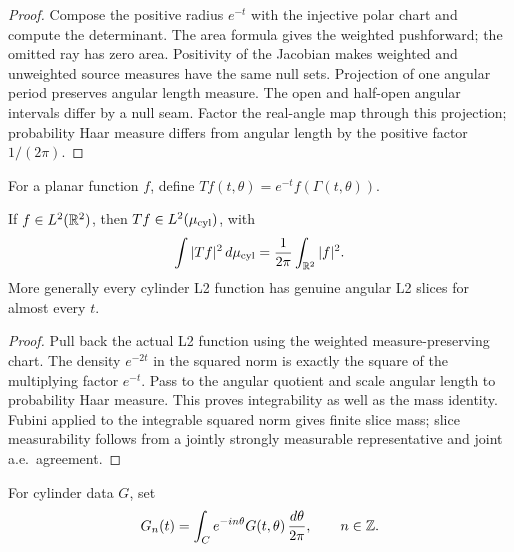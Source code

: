 \begin{proof}
\leanok
Compose the positive radius $e^{-t}$ with the injective polar chart and
compute the determinant. The area formula gives the weighted pushforward;
the omitted ray has zero area. Positivity of the Jacobian makes weighted
and unweighted source measures have the same null sets.
Projection of one angular period preserves angular length measure.
The open and half-open angular intervals differ by a null seam.
Factor the real-angle map through this projection; probability Haar measure
differs from angular length by the positive factor $1/(2\pi)$.
\end{proof}

\begin{definition}
\label{def:log-cylinder-l2-pullback}
\leanok
For a planar function $f$, define $Tf(t,\theta)=e^{-t}f(\Gamma(t,\theta))$.
\end{definition}

\begin{lemma}
\label{lem:log-cylinder-l2-mass}
\leanok
If $f\in L^2(\mathbb{R}^2)$, then $Tf\in L^2(\mu_{\rm cyl})$, with
\[
 \int |Tf|^2\,d\mu_{\rm cyl}=\frac1{2\pi}\int_{\mathbb{R}^2}|f|^2.
\]
More generally every cylinder L2 function has genuine angular L2 slices
for almost every $t$.
\end{lemma}

\begin{proof}
\leanok
Pull back the actual L2 function using the weighted measure-preserving chart.
The density $e^{-2t}$ in the squared norm is exactly the square of the
multiplying factor $e^{-t}$. Pass to the angular quotient and scale angular
length to probability Haar measure. This proves integrability as well as the
mass identity. Fubini applied to the integrable squared norm gives finite
slice mass; slice measurability follows from a jointly strongly measurable
representative and joint a.e.\ agreement.
\end{proof}

\begin{definition}
\label{def:cylinder-angular-analysis}
\leanok
For cylinder data $G$, set
\[
 G_n(t)=\int_C e^{-in\theta}G(t,\theta)\,\frac{d\theta}{2\pi},
 \qquad n\in\mathbb{Z}.
\]
\end{definition}

